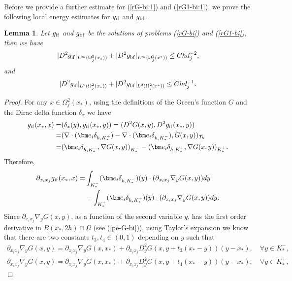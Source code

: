 \documentclass[1996/10/24]{amsart}
\newtheorem{lemma}[theorem]{Lemma}
\theoremstyle{definition}
\numberwithin{equation}{section}
\begin{document}
Before we provide a further estimate for (\ref{rG-bi:1}) and (\ref{rG1-bi:1}), we prove the following local energy estimates for $g_{{\rm if}}$ and $g_{{\rm bf}}$.
\begin{lemma}\label{rG-bi-lee}
Let $g_{{\rm if}}$ and $g_{{\rm bf}}$ be the solutions of problems (\ref{rG-bi}) and (\ref{rG1-bi}), then we have
\begin{align}
|D^2g_{{\rm if}}|_{L^{\infty}(\Omega_j^2(x_{\ast}))}+|D^2g_{{\rm bf}}|_{L^{\infty}(\Omega_j^2(x^{\ast}))}\leq Chd_j^{-2},
\end{align}
and
\begin{align}
|D^2g_{{\rm if}}|_{L^2(\Omega_j^2(x_{\ast}))}+|D^2g_{{\rm bf}}|_{L^2(\Omega_j^2(x^{\ast}))}\leq Chd_j^{-1}.
\end{align}
\end{lemma}
\begin{proof}
For any $x\in \Omega_j^2(x_{\ast})$, using the definitions of the Green's function $G$ and the Dirac delta function $\delta_x$ we have
\begin{align}
g_{{\rm if}}(x_{\ast},x)=&(\delta_x(y),g_{{\rm if}}(x_{\ast},y))=(D^2G(x,y),D^2g_{{\rm if}}(x_{\ast},y))\nonumber\\
=&(\nabla\cdot({\bm e}_i\delta_{h,K^+_{\ast}})-\nabla\cdot({\bm e}_i\delta_{h,K^-_{\ast}}),G(x,y))_{\mathcal{T}_h}\nonumber\\
=&({\bm e}_i\delta_{h,K^-_{\ast}},\nabla G(x,y))_{K^-_{\ast}}-({\bm e}_i\delta_{h,K^+_{\ast}},\nabla G(x,y))_{K^+_{\ast}}.\nonumber
\end{align}
Therefore,
\begin{align}
\partial_{x_ix_j} g_{{\rm if}}(x_{\ast},x)=&\int_{K^-_{\ast}}({\bm e}_i\delta_{h,K^-_{\ast}})(y)\cdot(\partial_{x_ix_j}\nabla_y G(x,y)) dy\label{rG-bi-lee-proof:1}\\
&-\int_{K^+_{\ast}}({\bm e}_i\delta_{h,K^+_{\ast}})(y)\cdot(\partial_{x_ix_j}\nabla_y G(x,y)) dy.\nonumber
\end{align}
Since $\partial_{x_ix_j}\nabla_y G(x,y)$, as a function of the second variable $y$, has the first order derivative in $B(x_{\ast},2h)\cap\Omega$ (see (\ref{pe-G-bi})), using Taylor's expansion
we know that there are two constants $t_3,t_4\in (0,1)$ depending on $y$ such that
\begin{align*}
\partial_{x_ix_j}\nabla_y G(x,y)=\partial_{x_ix_j}\nabla_y G(x,x_{\ast})+\partial_{x_ix_j}D^2_y G(x,y+t_3(x_{\ast}-y))(y-x_{\ast}),\quad \forall y\in K_{\ast}^-,\\
\partial_{x_ix_j}\nabla_y G(x,y)=\partial_{x_ix_j}\nabla_y G(x,x_{\ast})+\partial_{x_ix_j}D^2_y G(x,y+t_4(x_{\ast}-y))(y-x_{\ast}),\quad \forall y\in K_{\ast}^+,

\end{align*}
\end{proof}
\end{document}
